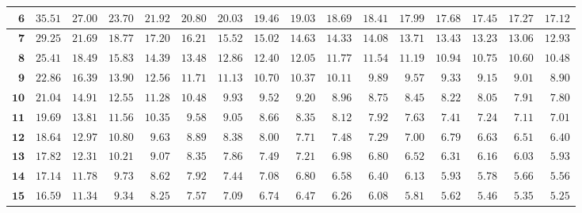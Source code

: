 \begin{customTableWrapper}{1.4}
\begin{longtable}{|r|r|r|r|r|r|r|r|r|r|r|r|r|r|r|r|}
    ${\mathbf{6}}$  & ${35.51}$   & ${27.00}$   & ${23.70}$   & ${21.92}$   & ${20.80}$   & ${20.03}$   & ${19.46}$   & ${19.03}$   & ${18.69}$   & ${18.41}$   & ${17.99}$   & ${17.68}$   & ${17.45}$   & ${17.27}$   & ${17.12}$   \\ \hline 
    ${\mathbf{7}}$  & ${29.25}$   & ${21.69}$   & ${18.77}$   & ${17.20}$   & ${16.21}$   & ${15.52}$   & ${15.02}$   & ${14.63}$   & ${14.33}$   & ${14.08}$   & ${13.71}$   & ${13.43}$   & ${13.23}$   & ${13.06}$   & ${12.93}$   \\ \hline 
    ${\mathbf{8}}$  & ${25.41}$   & ${18.49}$   & ${15.83}$   & ${14.39}$   & ${13.48}$   & ${12.86}$   & ${12.40}$   & ${12.05}$   & ${11.77}$   & ${11.54}$   & ${11.19}$   & ${10.94}$   & ${10.75}$   & ${10.60}$   & ${10.48}$   \\ \hline 
    ${\mathbf{9}}$  & ${22.86}$   & ${16.39}$   & ${13.90}$   & ${12.56}$   & ${11.71}$   & ${11.13}$   & ${10.70}$   & ${10.37}$   & ${10.11}$   & ${9.89}$   & ${9.57}$   & ${9.33}$   & ${9.15}$   & ${9.01}$   & ${8.90}$   \\ \hline 
    ${\mathbf{10}}$  & ${21.04}$   & ${14.91}$   & ${12.55}$   & ${11.28}$   & ${10.48}$   & ${9.93}$   & ${9.52}$   & ${9.20}$   & ${8.96}$   & ${8.75}$   & ${8.45}$   & ${8.22}$   & ${8.05}$   & ${7.91}$   & ${7.80}$   \\ \hline 
    ${\mathbf{11}}$  & ${19.69}$   & ${13.81}$   & ${11.56}$   & ${10.35}$   & ${9.58}$   & ${9.05}$   & ${8.66}$   & ${8.35}$   & ${8.12}$   & ${7.92}$   & ${7.63}$   & ${7.41}$   & ${7.24}$   & ${7.11}$   & ${7.01}$   \\ \hline 
    ${\mathbf{12}}$  & ${18.64}$   & ${12.97}$   & ${10.80}$   & ${9.63}$   & ${8.89}$   & ${8.38}$   & ${8.00}$   & ${7.71}$   & ${7.48}$   & ${7.29}$   & ${7.00}$   & ${6.79}$   & ${6.63}$   & ${6.51}$   & ${6.40}$   \\ \hline 
    ${\mathbf{13}}$  & ${17.82}$   & ${12.31}$   & ${10.21}$   & ${9.07}$   & ${8.35}$   & ${7.86}$   & ${7.49}$   & ${7.21}$   & ${6.98}$   & ${6.80}$   & ${6.52}$   & ${6.31}$   & ${6.16}$   & ${6.03}$   & ${5.93}$   \\ \hline 
    ${\mathbf{14}}$  & ${17.14}$   & ${11.78}$   & ${9.73}$   & ${8.62}$   & ${7.92}$   & ${7.44}$   & ${7.08}$   & ${6.80}$   & ${6.58}$   & ${6.40}$   & ${6.13}$   & ${5.93}$   & ${5.78}$   & ${5.66}$   & ${5.56}$   \\ \hline 
    ${\mathbf{15}}$  & ${16.59}$   & ${11.34}$   & ${9.34}$   & ${8.25}$   & ${7.57}$   & ${7.09}$   & ${6.74}$   & ${6.47}$   & ${6.26}$   & ${6.08}$   & ${5.81}$   & ${5.62}$   & ${5.46}$   & ${5.35}$   & ${5.25}$   \\ \hline 

\end{longtable}
\end{customTableWrapper}
